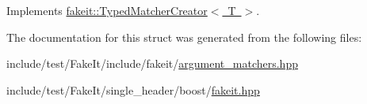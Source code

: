 Implements \mbox{\hyperlink{structfakeit_1_1TypedMatcherCreator_a40646cd11f8acf5c34b971f396891d5c}{fakeit\+::\+Typed\+Matcher\+Creator$<$ T $>$}}.



The documentation for this struct was generated from the following files\+:\begin{DoxyCompactItemize}
\item 
include/test/\+Fake\+It/include/fakeit/\mbox{\hyperlink{argument__matchers_8hpp}{argument\+\_\+matchers.\+hpp}}\item 
include/test/\+Fake\+It/single\+\_\+header/boost/\mbox{\hyperlink{single__header_2boost_2fakeit_8hpp}{fakeit.\+hpp}}\end{DoxyCompactItemize}
